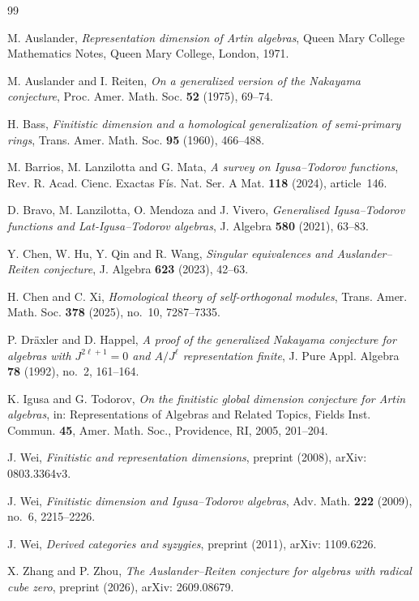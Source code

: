 \documentclass[a4paper,reqno]{amsart}
\numberwithin{equation}{section}
\theoremstyle{definition}
\begin{document}
\begin{thebibliography}{99}

{M. Auslander},
\emph{Representation dimension of Artin algebras},
Queen Mary College Mathematics Notes, Queen Mary College, London, 1971.


{M. Auslander and I. Reiten},
\emph{On a generalized version of the Nakayama conjecture},
Proc. Amer. Math. Soc. \textbf{52} (1975), 69--74.

{H. Bass},
\emph{Finitistic dimension and a homological generalization of semi-primary rings},
Trans. Amer. Math. Soc. \textbf{95} (1960), 466--488.


{M. Barrios, M. Lanzilotta and G. Mata},
\emph{A survey on Igusa--Todorov functions},
Rev. R. Acad. Cienc. Exactas F\'is. Nat. Ser. A Mat. \textbf{118} (2024), article~146.

{D. Bravo, M. Lanzilotta, O. Mendoza and J. Vivero},
\emph{Generalised Igusa--Todorov functions and Lat-Igusa--Todorov algebras},
J. Algebra \textbf{580} (2021), 63--83.

{Y. Chen, W. Hu, Y. Qin and R. Wang},
\emph{Singular equivalences and Auslander--Reiten conjecture},
J. Algebra \textbf{623} (2023), 42--63.

{H. Chen and C. Xi},
\emph{Homological theory of self-orthogonal modules},
Trans. Amer. Math. Soc. \textbf{378} (2025), no.~10, 7287--7335.


{P. Dr\"axler and D. Happel},
\emph{A proof of the generalized Nakayama conjecture for algebras with $J^{2\ell+1}=0$ and $A/J^\ell$ representation finite},
J. Pure Appl. Algebra \textbf{78} (1992), no.~2, 161--164.

{K. Igusa and G. Todorov},
\emph{On the finitistic global dimension conjecture for Artin algebras},
in: Representations of Algebras and Related Topics,
Fields Inst. Commun. \textbf{45}, Amer. Math. Soc., Providence, RI, 2005, 201--204.

{J. Wei},
\emph{Finitistic and representation dimensions},
preprint (2008), {arXiv: 0803.3364v3}.

{J. Wei},
\emph{Finitistic dimension and Igusa--Todorov algebras},
Adv. Math. \textbf{222} (2009), no.~6, 2215--2226.

{J. Wei},
\emph{Derived categories and syzygies},
preprint (2011), {arXiv: 1109.6226}.

{X. Zhang and P. Zhou},
\emph{The Auslander--Reiten conjecture for algebras with radical cube zero},
preprint (2026), {arXiv: 2609.08679}.

\end{thebibliography}
\end{document}
